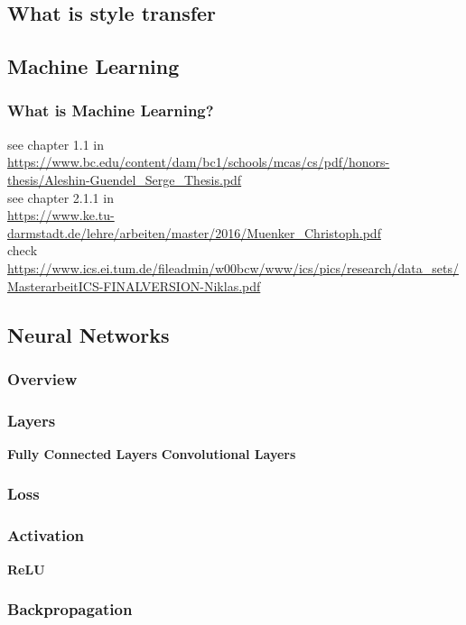 \documentclass[../Main.tex]{subfiles}
\begin{document}
\subsection{What is style transfer}

\subsection{Machine Learning} 
    \subsubsection{What is Machine Learning?}
    see chapter 1.1 in \\
    \url{https://www.bc.edu/content/dam/bc1/schools/mcas/cs/pdf/honors-thesis/Aleshin-Guendel_Serge_Thesis.pdf} \\
    see chapter 2.1.1 in \\
    \url{https://www.ke.tu-darmstadt.de/lehre/arbeiten/master/2016/Muenker_Christoph.pdf} \\
    check \\
    \url{https://www.ics.ei.tum.de/fileadmin/w00bcw/www/ics/pics/research/data_sets/MasterarbeitICS-FINALVERSION-Niklas.pdf}\\


\subsection{Neural Networks}
    \subsubsection{Overview}
    \subsubsection{Layers}
        \textbf{Fully Connected Layers}
        \textbf{Convolutional Layers}
    \subsubsection{Loss} %
    \subsubsection{Activation}
        \textbf{ReLU}
    \subsubsection{Backpropagation}
\end{document}
